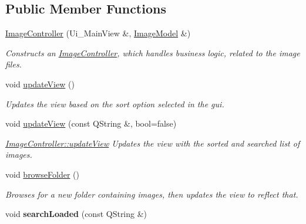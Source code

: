 \subsection*{Public Member Functions}
\begin{DoxyCompactItemize}
\item 
\hyperlink{classImageController_a317e49c29f50578a1001b73749151e3a}{Image\+Controller} (Ui\+\_\+\+Main\+View \&, \hyperlink{classImageModel}{Image\+Model} \&)
\begin{DoxyCompactList}\small\item\em Constructs an \hyperlink{classImageController}{Image\+Controller}, which handles business logic, related to the image files. \end{DoxyCompactList}\item 
\mbox{\label{classImageController_a3a300727ff5e30b19fcc0102427fdb30}} 
void \hyperlink{classImageController_a3a300727ff5e30b19fcc0102427fdb30}{update\+View} ()
\begin{DoxyCompactList}\small\item\em Updates the view based on the sort option selected in the gui. \end{DoxyCompactList}\item 
void \hyperlink{classImageController_a351762bc38206af05dc21dc6e183b1c3}{update\+View} (const Q\+String \&, bool=false)
\begin{DoxyCompactList}\small\item\em \hyperlink{classImageController_a3a300727ff5e30b19fcc0102427fdb30}{Image\+Controller\+::update\+View} Updates the view with the sorted and searched list of images. \end{DoxyCompactList}\item 
\mbox{\label{classImageController_a203590172b061a2e20d09dc9f8f060b7}} 
void \hyperlink{classImageController_a203590172b061a2e20d09dc9f8f060b7}{browse\+Folder} ()
\begin{DoxyCompactList}\small\item\em Browses for a new folder containing images, then updates the view to reflect that. \end{DoxyCompactList}\item 
\mbox{\label{classImageController_a29879b8ce218c266f100ef6da70687ca}} 
void {\bfseries search\+Loaded} (const Q\+String \&)
\item 

\end{DoxyCompactItemize}
